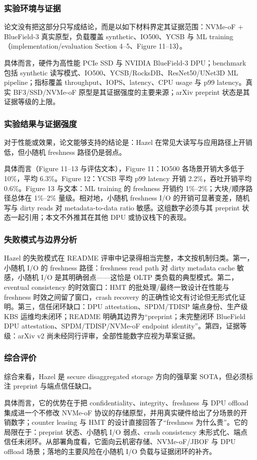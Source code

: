 \documentclass[11pt]{ctexart}
\begin{document}
\subsubsection{实验环境与证据}
论文没有把这部分只写成结论，而是以如下材料界定其证据范围：NVMe-oF + BlueField-3 真实原型，负载覆盖 synthetic、IO500、YCSB 与 ML training（implementation/evaluation Section 4--5、Figure 11--13）。\par
具体而言，硬件为高性能 PCIe SSD 与 NVIDIA BlueField-3 DPU；benchmark 包括 synthetic 读写模式、IO500、YCSB/RocksDB、ResNet50/UNet3D ML pipeline；指标覆盖 throughput、IOPS、latency、CPU usage 与 p99 latency。真实 BF3/SSD/NVMe-oF 原型是其证据强度的主要来源；arXiv preprint 状态是其证据等级的上限。\par
\subsubsection{实验结果与证据强度}
对于性能或效果，论文能够支持的结论是：Hazel 在常见大读写与应用路径上开销低，但小随机 freshness 路径仍是弱点。\par
具体而言（Figure 11--13 与评估文本），Figure 11：IO500 各场景开销大多低于 10\%，平均 6.3\%。Figure 12：YCSB 平均 p99 latency 开销 2.2\%，吞吐开销平均 0.6\%。Figure 13 与文本：ML training 的 freshness 开销约 1\%--2\%；大块/顺序路径总体在 1\%--2\% 量级。相对地，小随机 freshness I/O 的开销可显著变差，随机写与 dirty reads 对 metadata-to-data ratio 敏感。这组数字必须与其 preprint 状态一起引用；本文不外推其在其他 DPU 或协议栈下的表现。\par
\subsubsection{失败模式与边界分析}
Hazel 的失败模式在 README 评审中记录得相当完整，本文按机制归类。第一，小随机 I/O 的 freshness 路径：freshness read path 对 dirty metadata cache 敏感，小随机 I/O 是其明确弱点——这恰是 OLTP 类负载的典型模式。第二，eventual consistency 的时效窗口：HMT 的批处理/最终一致设计在性能与 freshness 时效之间留了窗口，crash recovery 的正确性论文有讨论但无形式化证明。第三，信任闭环缺口：DPU attestation、SPDM/TDISP 端点身份、生产级 KBS 运维均未闭环；README 明确其边界为“preprint；未完整闭环 BlueField DPU attestation、SPDM/TDISP/NVMe-oF endpoint identity”。第四，证据等级：arXiv v2 尚未经同行评审，全部性能数字应视为草案证据。\par
\subsubsection{综合评价}
综合来看，Hazel 是 secure disaggregated storage 方向的强草案 SOTA，但必须标注 preprint 与端点信任缺口。\par
具体而言，它的优势在于把 confidentiality、integrity、freshness 与 DPU offload 集成进一个不修改 NVMe-oF 协议的存储原型，并用真实硬件给出了分场景的开销数字；counter leasing 与 HMT 的设计直接回答了“freshness 为什么贵”。它的局限在于：preprint 状态、小随机 I/O 弱点、crash consistency 未形式化、端点信任未闭环。从部署角度看，它面向云机密存储、NVMe-oF/JBOF 与 DPU offload 场景；落地的主要风险在小随机 I/O 负载与证据闭环的补齐。\par
\end{document}
